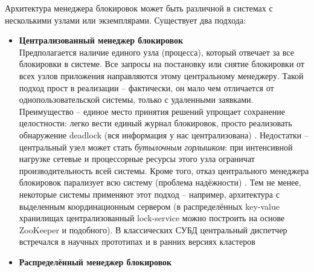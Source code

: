 Архитектура менеджера блокировок может быть различной в системах с несколькими узлами или экземплярами. Существует два подхода: 
 \begin{itemize}
    \item \textbf{Централизованный менеджер блокировок} ~\\
    Предполагается наличие единого узла (процесса), который отвечает за все блокировки в системе. Все запросы на постановку или снятие блокировки от всех узлов приложения направляются этому центральному менеджеру. Такой подход прост в реализации – фактически, он мало чем отличается от однопользовательской системы, только с удаленными заявками. Преимущество – единое место принятия решений упрощает сохранение целостности: легко вести единый журнал блокировок, просто реализовать обнаружение deadlock (вся информация у нас централизована) \autocite{Silberschatz}. Недостатки – центральный узел может стать \textit{бутылочным горлышком}: при интенсивной нагрузке сетевые и процессорные ресурсы этого узла ограничат производительность всей системы. Кроме того, отказ центрального менеджера блокировок парализует всю систему (проблема надёжности) \autocite{Silberschatz}. Тем не менее, некоторые системы применяют этот подход – например, архитектура с выделенным координационным сервером (в распределённых key-value хранилищах централизованный lock-service можно построить на основе ZooKeeper и подобного). В классических СУБД центральный диспетчер встречался в научных прототипах и в ранних версиях кластеров
    \item \textbf{Распределённый менеджер блокировок} ~\\

\end{itemize}
